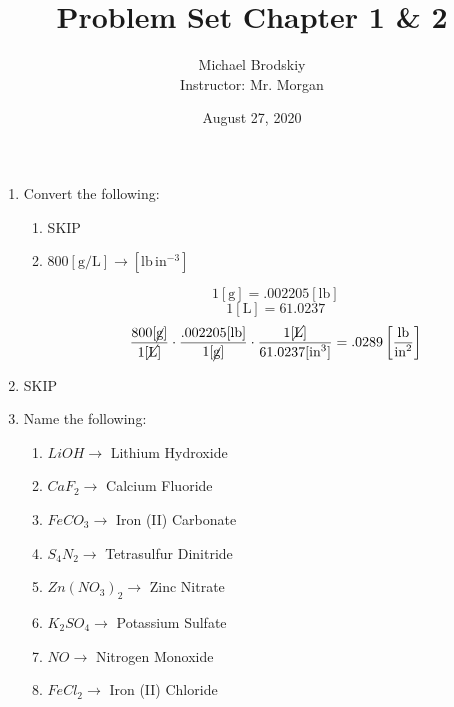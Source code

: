 \documentclass[12pt]{article}
\title{Problem Set Chapter 1 \& 2}
\date{August 27, 2020}
\author{Michael Brodskiy\\ \small Instructor: Mr. Morgan}
\begin{document}
\maketitle

\begin{enumerate}

  \item Convert the following:

    \begin{enumerate}

      \item SKIP
        
      \item $800[\si{\gram\per\liter}]\to [\text{lb}\,\text{in}^{-3}]$

        $$1[\si{\gram}]=.002205[\text{lb}]$$
        $$1[\si{\liter}]=61.0237$$
        $$\frac{800[\cancel{\si{\gram}}]}{1[\cancel{\si{\liter}}]}\cdot\frac{.002205[\text{lb}]}{1[\cancel{\si{\gram}}]}\cdot\frac{1[\cancel{\si{\liter}}]}{61.0237[\text{in}^3]}=.0289\left[\frac{\text{lb}}{\text{in}^2}\right]$$

    \end{enumerate}

  \item SKIP

  \item Name the following:

    \begin{enumerate}

      \item $LiOH \rightarrow$ Lithium Hydroxide

      \item $CaF_2 \rightarrow$ Calcium Fluoride

      \item $FeCO_3 \rightarrow$ Iron (II) Carbonate

      \item $S_4N_2 \rightarrow$ Tetrasulfur Dinitride

      \item $Zn(NO_3)_2 \rightarrow$ Zinc Nitrate
        
      \item $K_2SO_4 \rightarrow$ Potassium Sulfate

      \item $NO \rightarrow$ Nitrogen Monoxide

      \item $FeCl_2 \rightarrow$ Iron (II) Chloride


\end{enumerate}
\end{enumerate}
\end{document}
